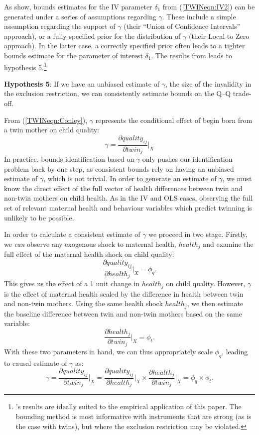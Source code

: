 \documentclass[subeqn]{article}
\begin{document}
\begin{spacing}{1.4}
As \citet{Conleyetal2012} show, bounds estimates for the IV parameter $\delta_1$
from (\ref{TWINeqn:IV2}) can be generated under a series of assumptions regarding
$\gamma$.  These include a simple assumption regarding the support of $\gamma$
(their ``Union of Confidence Intervals'' approach), or a fully specified prior
for the distribution of $\gamma$ (their Local to Zero approach).  In the latter
case, a correctly specified prior often leads to a tighter bounds estimate for
the parameter of interest $\delta_1$.  The results from \citet{Conleyetal2012}
leads to hypothesis 5.\footnote{\citeauthor{Conleyetal2012}'s results are ideally
  suited to the empirical application of this paper.  The bounding method is most
  informative with instruments that are strong (as is the case with twins), but
  where the exclusion restriction may be violated.}

\noindent \textbf{Hypothesis 5}: If we have an unbiased estimate of $\gamma$, the size of the invalidity in the exclusion restriction, we can consistently estimate bounds on the Q--Q trade-off.

From (\ref{TWINeqn:Conley}), $\gamma$ represents the conditional effect of
begin born from a twin mother on child quality:
\[
\gamma=\frac{\partial quality_{ij}}{\partial twin_j}\bigg|_{X}
\]
In practice, bounds identification based on $\gamma$ only pushes our
identification problem back by one step, as consistent bounds rely on having
an unbiased estimate of $\gamma$, which is not trivial.  In order to generate
an estimate of $\gamma$, we must know the direct effect of the full vector of
health differences between twin and non-twin mothers on child health.  As in
the IV and OLS cases, observing the full set of relevant maternal health and
behaviour variables which predict twinning is unlikely to be possible.

In order to calculate a consistent estimate of $\gamma$ we proceed in two
stage.  Firstly, we \emph{can} observe any exogenous shock to maternal health,
$health_j$ and examine the full effect of the maternal health shock on child
quality:
\[
\frac{\partial quality_{ij}}{\partial health_j}\bigg|_{X}=\phi_q.
\]
This gives us the effect of a 1 unit change in $health_j$ on child quality.
However, $\gamma$ is the effect of maternal health scaled by the difference
in health between twin and non-twin mothers.  Using the same health shock
$health_j$, we then estimate the baseline difference between twin and non-twin
mothers based on the same variable:
\[
\frac{\partial health_j}{\partial twin_j}\bigg|_{X}=\phi_t.\]
With these two parameters in hand, we can thus appropriately scale $\phi_q$,
leading to causal estimate of $\gamma$ as:
\begin{equation}
  \gamma=\frac{\partial quality_{ij}}{\partial twin_j}\bigg|_{X} = \frac{\partial quality_{ij}}{\partial health_j}\bigg|_{X} \times \frac{\partial health_j}{\partial twin_j}\bigg|_{X} =\phi_q\times\phi_t.
\end{equation}


\end{spacing}
\end{document}
